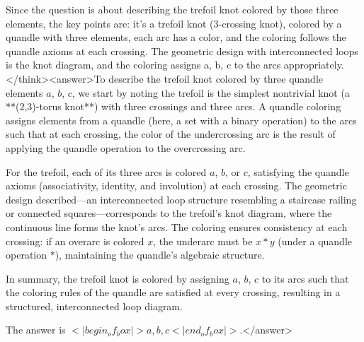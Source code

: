 Since the question is about describing the trefoil knot colored by those three elements, the key points are: it's a trefoil knot (3-crossing knot), colored by a quandle with three elements, each arc has a color, and the coloring follows the quandle axioms at each crossing. The geometric design with interconnected loops is the knot diagram, and the coloring assigns a, b, c to the arcs appropriately.</think><answer>To describe the trefoil knot colored by three quandle elements \(a\), \(b\), \(c\), we start by noting the trefoil is the simplest nontrivial knot (a **(2,3)-torus knot**) with three crossings and three arcs. A quandle coloring assigns elements from a quandle (here, a set with a binary operation) to the arcs such that at each crossing, the color of the undercrossing arc is the result of applying the quandle operation to the overcrossing arc.  

For the trefoil, each of its three arcs is colored \(a\), \(b\), or \(c\), satisfying the quandle axioms (associativity, identity, and involution) at each crossing. The geometric design described—an interconnected loop structure resembling a staircase railing or connected squares—corresponds to the trefoil’s knot diagram, where the continuous line forms the knot’s arcs. The coloring ensures consistency at each crossing: if an overarc is colored \(x\), the underarc must be \(x*y\) (under a quandle operation \(*\)), maintaining the quandle’s algebraic structure.  

In summary, the trefoil knot is colored by assigning \(a\), \(b\), \(c\) to its arcs such that the coloring rules of the quandle are satisfied at every crossing, resulting in a structured, interconnected loop diagram.  

The answer is \(<|begin_of_box|>a, b, c<|end_of_box|>\).</answer>